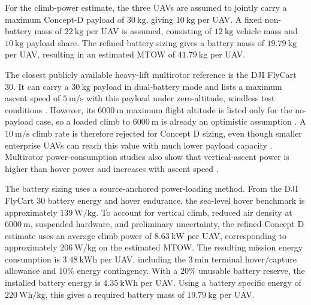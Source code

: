 For the climb-power estimate, the three UAVs are assumed to jointly carry a maximum Concept-D payload of \(30~\mathrm{kg}\), giving \(10~\mathrm{kg}\) per UAV. A fixed non-battery mass of \(22~\mathrm{kg}\) per UAV is assumed, consisting of \(12~\mathrm{kg}\) vehicle mass and \(10~\mathrm{kg}\) payload share. The refined battery sizing gives a battery mass of \(19.79~\mathrm{kg}\) per UAV, resulting in an estimated MTOW of \(41.79~\mathrm{kg}\) per UAV.

The closest publicly available heavy-lift multirotor reference is the DJI FlyCart 30. It can carry a \(30~\mathrm{kg}\) payload in dual-battery mode and lists a maximum ascent speed of \(5~\mathrm{m/s}\) with this payload under zero-altitude, windless test conditions \cite{DJI2026DJISpecifications}. However, its \(6000~\mathrm{m}\) maximum flight altitude is listed only for the no-payload case, so a loaded climb to \(6000~\mathrm{m}\) is already an optimistic assumption \cite{DJI2026DJISpecifications}. A \(10~\mathrm{m/s}\) climb rate is therefore rejected for Concept D sizing, even though smaller enterprise UAVs can reach this value with much lower payload capacity \cite{DJI2026DJISpecificationsd}. Multirotor power-consumption studies also show that vertical-ascent power is higher than hover power and increases with ascent speed \cite{Gong2022ModellingUAVs}.

The battery sizing uses a source-anchored power-loading method. From the DJI FlyCart 30 battery energy and hover endurance, the sea-level hover benchmark is approximately \(139~\mathrm{W/kg}\). To account for vertical climb, reduced air density at \(6000~\mathrm{m}\), suspended hardware, and preliminary uncertainty, the refined Concept D estimate uses an average climb power of \(8.63~\mathrm{kW}\) per UAV, corresponding to approximately \(206~\mathrm{W/kg}\) on the estimated MTOW. The resulting mission energy consumption is \(3.48~\mathrm{kWh}\) per UAV, including the \(3~\mathrm{min}\) terminal hover/capture allowance and \(10\%\) energy contingency. With a \(20\%\) unusable battery reserve, the installed battery energy is \(4.35~\mathrm{kWh}\) per UAV. Using a battery specific energy of \(220~\mathrm{Wh/kg}\), this gives a required battery mass of \(19.79~\mathrm{kg}\) per UAV.


